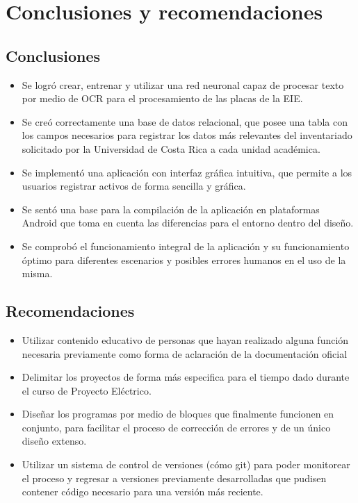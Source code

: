   \chapter{Conclusiones y recomendaciones}
\label{C:conclusiones}
\section{Conclusiones}
\begin{itemize}
    \item Se logró crear, entrenar y utilizar una red neuronal capaz de procesar texto por medio de OCR para el procesamiento de las placas de la EIE.
    \item Se creó correctamente una base de datos relacional, que posee una tabla con los campos necesarios para registrar los datos más relevantes del inventariado solicitado por la Universidad de Costa Rica a cada unidad académica.
    \item Se implementó una aplicación con interfaz gráfica intuitiva, que permite a los usuarios registrar activos de forma sencilla y gráfica.
    \item Se sentó una base para la compilación de la aplicación en plataformas Android que toma en cuenta las diferencias para el entorno dentro del diseño.
    \item Se comprobó el funcionamiento integral de la aplicación y su funcionamiento óptimo para diferentes escenarios y posibles errores humanos en el uso de la misma.

    
\end{itemize}


\section{Recomendaciones}
\begin{itemize}
    \item Utilizar contenido educativo de personas que hayan realizado alguna función necesaria previamente como forma de aclaración de la documentación oficial
    \item Delimitar los proyectos de forma más especifica para el tiempo dado durante el curso de Proyecto Eléctrico.
    \item Diseñar los programas por medio de bloques que finalmente funcionen en conjunto, para facilitar el proceso de corrección de errores y de un único diseño extenso.
    \item Utilizar un sistema de control de versiones (cómo git) para poder monitorear el proceso y regresar a versiones previamente desarrolladas que pudisen contener código necesario para una versión más reciente.
\end{itemize}